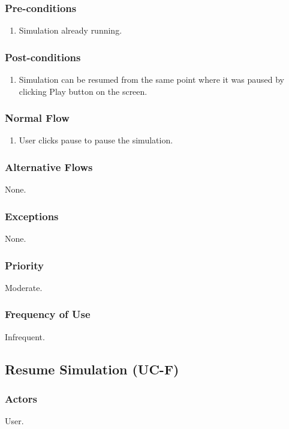\documentclass[a4paper,11pt,titlepage]{article}
\begin{document}
\subsubsection{Pre-conditions}

\begin{enumerate}
  \item Simulation already running.
\end{enumerate}

\subsubsection{Post-conditions}

\begin{enumerate}
  \item Simulation can be resumed from the same point where it was paused by clicking Play button on the screen.
\end{enumerate}

\subsubsection{Normal Flow}
\begin{enumerate}
  \item User clicks pause to pause the simulation.
\end{enumerate}

\subsubsection{Alternative Flows}
None.

\subsubsection{Exceptions}
None.


\subsubsection{Priority}
Moderate.

\subsubsection{Frequency of Use}
Infrequent.


\subsection{Resume Simulation (UC-F)}
\subsubsection{Actors}
User.
\end{document}
